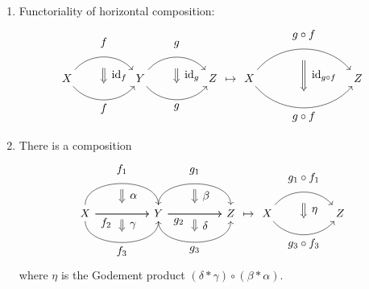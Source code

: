 \begin{defi}
\begin{enumerate}
		\item 
		Functoriality of horizontal composition:
		\[
		\begin{tikzcd}
			X
			\arrow[bend left=50]{rr}[name=U',label=above:$f$]{}
			\arrow[bend right=50]{rr}[name=D',label=below:$f$]{}
			&&
			Y
			\arrow[shorten <=10pt,shorten >=10pt,Rightarrow,to path={(U')-- node[label=right:$ \id_f $] {} (D')}]{} 
			\arrow[bend left=50]{rr}[name=U'',label=above:$g$]{}
			\arrow[bend right=50]{rr}[name=D'',label=below:$g$]{}
			&&
			Z
			\arrow[shorten <=10pt,shorten >=10pt,Rightarrow,to path={(U'')-- node[label=right:$ \id_g $] {} (D'')}]{} 
		\end{tikzcd}
		\mapsto
			\begin{tikzcd}[column sep=1.4cm]
			X
			\arrow[bend left=50]{rr}[name=U',label=above:$g \circ f$]{}
			\arrow[bend right=50]{rr}[name=D',label=below:$g \circ f$]{}
			&&
			Z
			\arrow[shorten <=10pt,shorten >=10pt,Rightarrow,to path={(U')-- node[label=right:$ \id_{ g \circ f } $] {} (D')}]{} 
		\end{tikzcd} 
		\]
		
		\item 
		There is a composition
		\[
		\begin{tikzcd}[column sep=huge]	
			X
			\arrow[bend left=90]{r}[name=U,label=above:$f_1$]{}
			\arrow[bend right=90]{r}[name=D,label=below:$f_3$]{}
			\arrow{r}[name=M]{}
			\arrow{r}[label=below:$f_2$, pos=0.2]{}
			&
			Y
			\arrow[shorten <=5pt,shorten >=5pt,Rightarrow,to path={(U) -- node[label=right:$\alpha$] {} (M)}]{}
			\arrow[shorten <=5pt,shorten >=5pt,Rightarrow,to path={(M) -- node[label=right:$\gamma$] {} (D)}]{}
			\arrow[bend left=90]{r}[name=U',label=above:$g_1$]{}
			\arrow[bend right=90]{r}[name=D',label=below:$g_3$]{}
			\arrow{r}[name=M']{}
			\arrow{r}[label=below:$g_2$, pos=0.2]{}
			&
			Z
			\arrow[shorten <=5pt,shorten >=5pt,Rightarrow,to path={(U') -- node[label=right:$\beta$] {} (M')}]{}
			\arrow[shorten <=5pt,shorten >=5pt,Rightarrow,to path={(M') -- node[label=right:$\delta$] {} (D')}]{}    	
		\end{tikzcd}	
		\mapsto 
		\begin{tikzcd}
			X
			\arrow[bend left=50]{rr}[name=U',label=above:$g_1 \circ f_1$]{}
			\arrow[bend right=50]{rr}[name=D',label=below:$g_3 \circ f_3$]{}
			&&
			Z
			\arrow[shorten <=10pt,shorten >=10pt,Rightarrow,to path={(U')-- node[label=right:$ \eta $] {} (D')}]{}
		\end{tikzcd}	
		\]
		where $\eta $ is the Godement product $( \delta * \gamma ) \circ ( \beta * \alpha ) $.
	\end{enumerate}


\end{defi}
